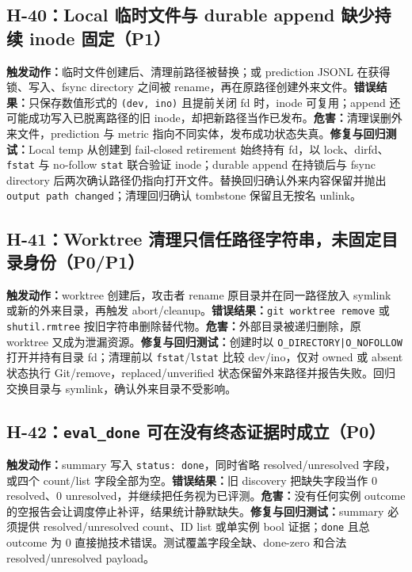 \documentclass[11pt,a4paper,fontset=fandol]{ctexart}
\newcommand{\code}[1]{\texttt{#1}}
\begin{document}
\subsection{H-40：Local 临时文件与 durable append 缺少持续 inode 固定（P1）}

\textbf{触发动作：}临时文件创建后、清理前路径被替换；或 prediction JSONL 在获得锁、写入、fsync directory 之间被 rename，再在原路径创建外来文件。\textbf{错误结果：}只保存数值形式的 \code{(dev, ino)} 且提前关闭 fd 时，inode 可复用；append 还可能成功写入已脱离路径的旧 inode，却把新路径当作已发布。\textbf{危害：}清理误删外来文件，prediction 与 metric 指向不同实体，发布成功状态失真。\textbf{修复与回归测试：}Local temp 从创建到 fail-closed retirement 始终持有 fd，以 lock、dirfd、\code{fstat} 与 no-follow \code{stat} 联合验证 inode；durable append 在持锁后与 fsync directory 后两次确认路径仍指向打开文件。替换回归确认外来内容保留并抛出 \code{output path changed}；清理回归确认 tombstone 保留且无按名 unlink。

\subsection{H-41：Worktree 清理只信任路径字符串，未固定目录身份（P0/P1）}

\textbf{触发动作：}worktree 创建后，攻击者 rename 原目录并在同一路径放入 symlink 或新的外来目录，再触发 abort/cleanup。\textbf{错误结果：}\code{git worktree remove} 或 \code{shutil.rmtree} 按旧字符串删除替代物。\textbf{危害：}外部目录被递归删除，原 worktree 又成为泄漏资源。\textbf{修复与回归测试：}创建时以 \code{O\_DIRECTORY|O\_NOFOLLOW} 打开并持有目录 fd；清理前以 \code{fstat}/\code{lstat} 比较 dev/ino，仅对 owned 或 absent 状态执行 Git/remove，replaced/unverified 状态保留外来路径并报告失败。回归交换目录与 symlink，确认外来目录不受影响。

\subsection{H-42：\code{eval\_done} 可在没有终态证据时成立（P0）}

\textbf{触发动作：}summary 写入 \code{status: done}，同时省略 resolved/unresolved 字段，或四个 count/list 字段全部为空。\textbf{错误结果：}旧 discovery 把缺失字段当作 0 resolved、0 unresolved，并继续把任务视为已评测。\textbf{危害：}没有任何实例 outcome 的空报告会让调度停止补评，结果统计静默缺失。\textbf{修复与回归测试：}summary 必须提供 resolved/unresolved count、ID list 或单实例 bool 证据；\code{done} 且总 outcome 为 0 直接抛技术错误。测试覆盖字段全缺、done-zero 和合法 resolved/unresolved payload。
\end{document}
